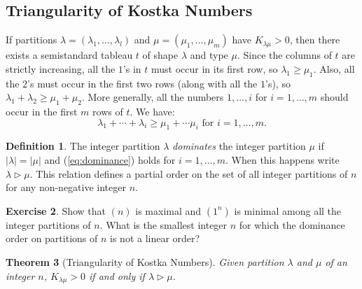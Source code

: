\documentclass[11pt]{amsproc}
\newtheorem{theorem}{Theorem}[subsection]
\theoremstyle{definition}
\newtheorem{definition}[theorem]{Definition}
\theoremstyle{example}
\newtheorem{exercise}[theorem]{Exercise}
\begin{document}
\subsection{Triangularity of Kostka Numbers}
\label{sec:triang-kostka-numb}
If partitions $\lambda=(\lambda_1,\dotsc,\lambda_l)$ and $\mu=(\mu_1,\dotsc,\mu_m)$ have $K_{\lambda\mu}>0$,
then there exists a semistandard tableau $t$ of shape $\lambda$ and type $\mu$.
Since the columns of $t$ are strictly increasing, all the $1$'s in $t$ must occur in its first row, so $\lambda_1\geq \mu_1$.
Also, all the $2$'s must occur in the first two rows (along with all the $1$'s), so $\lambda_1+\lambda_2\geq \mu_1+\mu_2$.
More generally, all the numbers $1,\dotsc, i$ for $i=1,\dotsc,m$ should occur in the first $m$ rows of $t$.
We have:
\begin{equation}
  \label{eq:dominance}
  \lambda_1+\dotsb + \lambda_i \geq \mu_1+\dotsb \mu_i \text{ for } i=1,\dotsc, m.
\end{equation}
\begin{definition}
  The integer partition $\lambda$ \emph{dominates} the integer partition $\mu$ if $|\lambda|=|\mu|$ and (\ref{eq:dominance}) holds for $i=1,\dotsc,m$.
  When this happens write $\lambda\rhd \mu$.
  This relation defines a partial order on the set of all integer partitions of $n$ for any non-negative integer $n$.
\end{definition}
\begin{exercise}
  Show that $(n)$ is maximal and $(1^n)$ is minimal among all the integer partitions of $n$.
  What is the smallest integer $n$ for which the dominance order on partitions of $n$ is not a linear order?
\end{exercise}
\begin{theorem}
  [Triangularity of Kostka Numbers]
  \label{theorem:Kostka-triangularity}
  Given partition $\lambda$ and $\mu$ of an integer $n$, $K_{\lambda\mu}>0$ if and only if $\lambda\rhd\mu$.
\end{theorem}
\end{document}
